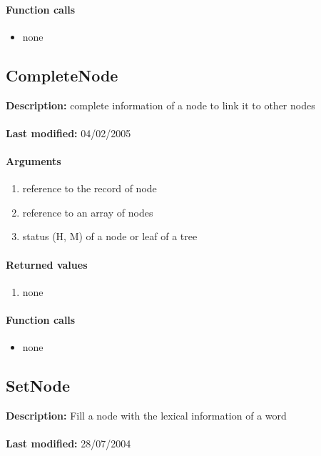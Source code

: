 \paragraph{Function calls}
\begin{itemize}
\item none
\end{itemize}

\subsection{CompleteNode}
\textbf{Description:} complete information of a node to link it to other nodes\\
\\\textbf{Last modified:} 04/02/2005

\paragraph{Arguments}
\begin{enumerate}
\item reference to the record of node
\item reference to an array of nodes
\item status (H, M) of a node or leaf of a tree
\end{enumerate}

\paragraph{Returned values}
\begin{enumerate}
\item none
\end{enumerate}

\paragraph{Function calls}
\begin{itemize}
\item none
\end{itemize}

\subsection{SetNode}
\textbf{Description:} Fill a node with the lexical information of a word\\
\\\textbf{Last modified:} 28/07/2004

